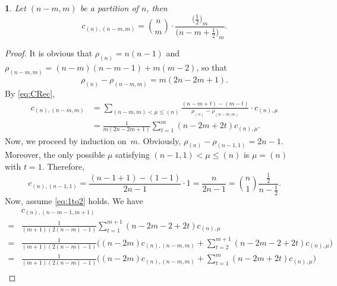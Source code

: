 \documentclass[10pt,oneside,american]{amsart}
\numberwithin{equation}{section}
\numberwithin{figure}{section}
\theoremstyle{plain}
\newtheorem{thm}{\protect\theoremname}[section]
\theoremstyle{definition}
\theoremstyle{remark}
\theoremstyle{plain}
\theoremstyle{definition}
\theoremstyle{plain}
\theoremstyle{plain}
\providecommand{\theoremname}{Theorem}
\begin{document}
\begin{thm}\label{thm:row1}
Let $\left(n-m,m\right)$ be a partition of $n$, then
\begin{equation}\label{eq:1to2}
  c_{\left(n\right),\left(n-m,m\right)} =
  \binom{n}{m}\cdot\frac{\bigl(\frac12\bigr)_m}{\bigl(n-m+\frac12\bigr)_m}.
\end{equation}
\end{thm}
\begin{proof}
It is obvious that $\rho_{\left(n\right)}=n\left(n-1\right)$ and $\rho_{\left(n-m,m\right)}=\left(n-m\right)\left(n-m-1\right)+m\left(m-2\right)$,
so that 
\[%
  \rho_{\left(n\right)}-\rho_{\left(n-m,m\right)}=m\left(2n-2m+1\right). \label{eq:coeff1to2}
\]%
By \eqref{eq:CRec},
\begin{align*}
  c_{\left(n\right),\left(n-m,m\right)}
  &= \sum_{\left(n-m,m\right)<\mu\leq\left(n\right)}\frac{\left(n-m+t\right)-\left(m-t\right)}
    {\rho_{\left(n\right)}-\rho_{\left(n-m,m\right)}}\cdot c_{\left(n\right),\mu} \\
  &= \frac{1}{m\left(2n-2m+1\right)}\sum_{t=1}^{m}\left(n-2m+2t\right)c_{\left(n\right),\mu}.
\end{align*}
Now, we proceed by induction on~$m$. Obviously, $ \rho_{\left(n\right)}-\rho_{\left(n-1,1\right)}=2n-1$. 
Moreover, the only possible $\mu$ satisfying $\left(n-1,1\right)<\mu\leq\left(n\right)$
is $\mu=\left(n\right)$ with $t=1$. Therefore, 
\begin{equation}\label{eq:cnton1}
  c_{\left(n\right),\left(n-1,1\right)}=\frac{\left(n-1+1\right)-\left(1-1\right)}{2n-1}\cdot1=\frac{n}{2n-1}=\binom{n}{1}\frac{\frac{1}{2}}{n-\frac{1}{2}}.
\end{equation}
Now, assume \eqref{eq:1to2} holds. We have
\begin{align*}
 & c_{\left(n\right),\left(n-m-1,m+1\right)}  \\
 =& \frac{1}{\left(m+1\right)\left(2\left(n-m\right)-1\right)}\sum_{t=1}^{m+1}\left(n-2m-2+2t\right)c_{\left(n\right),\mu}\\
= & \frac{1}{\left(m+1\right)\left(2\left(n-m\right)-1\right)}\biggl(\left(n-2m\right)c_{\left(n\right),\left(n-m,m\right)}+\sum_{t=2}^{m+1}\left(n-2m-2+2t\right)c_{\left(n\right),\mu}\biggr)\\
 =& \frac{1}{\left(m+1\right)\left(2\left(n-m\right)-1\right)}\biggl(\left(n-2m\right)c_{\left(n\right),\left(n-m,m\right)}+\sum_{t=1}^{m}\left(n-2m+2t\right)c_{\left(n\right),\mu}\biggr)\\

\end{align*}
\end{proof}
\end{document}
